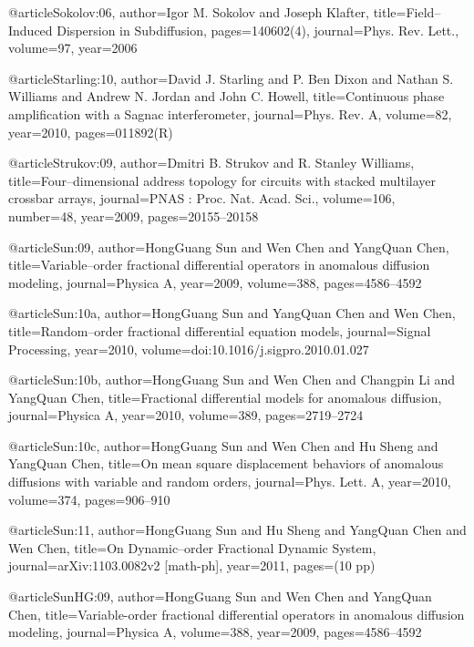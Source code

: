 \begin{thebibliography}{99}
@article{Sokolov:06,
  author={Igor M. Sokolov and Joseph Klafter},
  title={Field--Induced Dispersion in Subdiffusion},
  pages={140602(4)},
  journal={Phys. Rev. Lett.},
  volume={97},
  year={2006}
}

@article{Starling:10,
  author={David J. Starling and P. Ben Dixon and Nathan S. Williams and Andrew
    N. Jordan and John C. Howell},
  title={Continuous phase amplification with a {S}agnac interferometer},
  journal={Phys. Rev. A},
  volume={82},
  year={2010},
  pages={011892(R)}
}

@article{Strukov:09,
  author={Dmitri B. Strukov and R. Stanley Williams},
  title={Four--dimensional address topology for circuits with stacked multilayer
    crossbar arrays},
  journal={PNAS : Proc. Nat. Acad. Sci.},
  volume={106},
  number={48},
  year={2009},
  pages={20155--20158}
}

@article{Sun:09,
  author={HongGuang Sun and Wen Chen and YangQuan Chen},
  title={Variable--order fractional differential operators in anomalous diffusion
    modeling},
  journal={Physica A},
  year={2009},
  volume={388},
  pages={4586--4592}
}

@article{Sun:10a,
  author={HongGuang Sun and YangQuan Chen and Wen Chen},
  title={Random--order fractional differential equation models},
  journal={Signal Processing},
  year={2010},
  volume={doi:10.1016/j.sigpro.2010.01.027}
}

@article{Sun:10b,
  author={HongGuang Sun and Wen Chen and Changpin Li and YangQuan Chen},
  title={Fractional differential models for anomalous diffusion},
  journal={Physica A},
  year={2010},
  volume={389},
  pages={2719--2724}
}

@article{Sun:10c,
  author={HongGuang Sun and Wen Chen and Hu Sheng and YangQuan Chen},
  title={On mean square displacement behaviors of anomalous diffusions with variable
    and random orders},
  journal={Phys. Lett. A},
  year={2010},
  volume={374},
  pages={906--910}
}

@article{Sun:11,
  author={HongGuang Sun and Hu Sheng and Yang{Q}uan Chen and Wen Chen},
  title={On Dynamic--order Fractional Dynamic System},
  journal={arXiv:1103.0082v2 [math-ph]},
  year={2011},
  pages={(10 pp)}
}

@article{SunHG:09,
  author={HongGuang Sun and Wen Chen and Yang{Q}uan Chen},
  title={Variable-order fractional differential operators in anomalous diffusion
    modeling},
  journal={Physica A},
  volume={388},
  year={2009},
  pages={4586--4592}
}


\end{thebibliography}
